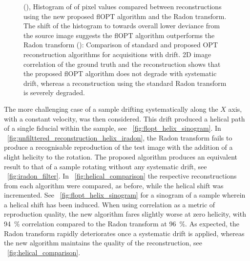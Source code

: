 \documentclass[times, twoside, watermark]{zHenriquesLab-StyleBioRxiv}
\begin{document}
\begin{figure}
{  (), Histogram of of pixel values compared between reconstructions using the new proposed flOPT algorithm and the \gls{Radon transform}.
  The shift of the histogram to towards overall lower deviance from the source image suggests the flOPT algorithm outperforms the \gls{Radon transform}
  (): Comparison of standard and proposed \gls{OPT} reconstruction algorithms for acquisitions with drift.
  2D image correlation of the ground truth and the reconstruction shows that the proposed flOPT algorithm does not degrade with systematic drift, whereas a reconstruction using the standard \gls{Radon transform} is severely degraded.}
\end{figure}


The more challenging case of a sample drifting systematically along the \(X\) axis, with a constant velocity, was then considered. This drift produced a helical path of a single fiducial within the sample, see \figurename~\ref{fig:flopt_helix_sinogram}.
In \figurename~\ref{fig:unfilttered_reconstruction_helix_iradon}, the \gls{Radon transform} fails to produce a recognisable reproduction of the test image with the addition of a slight helicity to the rotation.
The proposed algorithm produces an equivalent result to that of a sample rotating without any systematic drift, see \figurename~\ref{fig:iradon_filter}.
In \figurename~\ref{fig:helical_comparison} the respective reconstructions from each algorithm were compared, as before, while the helical shift was incremented.
See \figurename~\ref{fig:flopt_helix_sinogram} for a sinogram of a sample wherein a helical shift has been induced.
When using correlation as a metric of reproduction quality, the new algorithm fares slightly worse at zero helicity, with \SI{94}{\percent} correlation compared to the \gls{Radon transform} at \SI{96}{\percent}.
As expected, the \gls{Radon transform} rapidly deteriorates once a systematic drift is applied, whereas the new algorithm maintains the quality of the reconstruction, see \figurename~\ref{fig:helical_comparison}.
\end{document}
